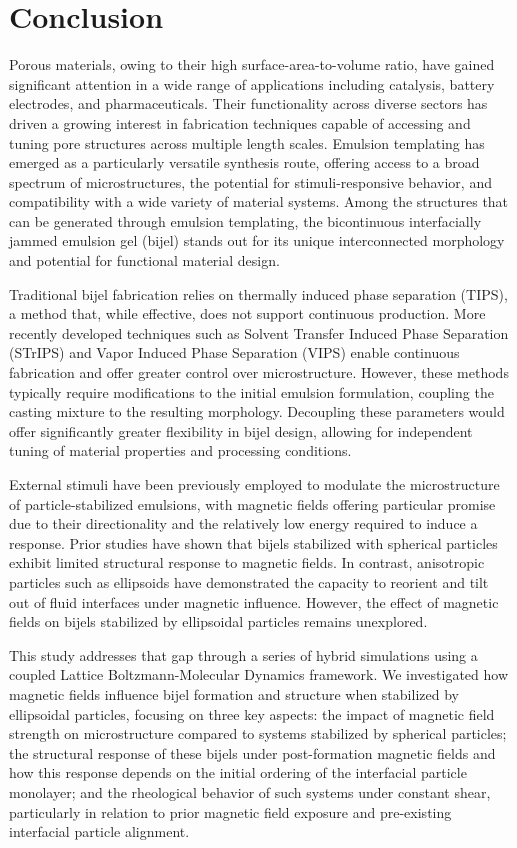 \section{Conclusion}

Porous materials, owing to their high surface-area-to-volume ratio, have gained significant attention in a wide range of 
applications including catalysis, battery electrodes, and pharmaceuticals. Their functionality across diverse sectors has 
driven a growing interest in fabrication techniques capable of accessing and tuning pore structures across multiple length 
scales. Emulsion templating has emerged as a particularly versatile synthesis route, offering access to a broad spectrum of 
microstructures, the potential for stimuli-responsive behavior, and compatibility with a wide variety of material systems. 
Among the structures that can be generated through emulsion templating, the bicontinuous interfacially jammed emulsion gel 
(bijel) stands out for its unique interconnected morphology and potential for functional material design.

Traditional bijel fabrication relies on thermally induced phase separation (TIPS), a method that, while effective, does not 
support continuous production. More recently developed techniques such as Solvent Transfer Induced Phase Separation (STrIPS) 
and Vapor Induced Phase Separation (VIPS) enable continuous fabrication and offer greater control over microstructure. However, 
these methods typically require modifications to the initial emulsion formulation, coupling the casting mixture to the resulting 
morphology. Decoupling these parameters would offer significantly greater flexibility in bijel design, allowing for independent 
tuning of material properties and processing conditions.

External stimuli have been previously employed to modulate the microstructure of particle-stabilized emulsions, with magnetic 
fields offering particular promise due to their directionality and the relatively low energy required to induce a response. Prior 
studies have shown that bijels stabilized with spherical particles exhibit limited structural response to magnetic fields. In 
contrast, anisotropic particles such as ellipsoids have demonstrated the capacity to reorient and tilt out of fluid interfaces 
under magnetic influence. However, the effect of magnetic fields on bijels stabilized by ellipsoidal particles remains unexplored.

This study addresses that gap through a series of hybrid simulations using a coupled Lattice Boltzmann-Molecular Dynamics framework. 
We investigated how magnetic fields influence bijel formation and structure when stabilized by ellipsoidal particles, focusing on 
three key aspects: the impact of magnetic field strength on microstructure compared to systems stabilized by spherical particles; 
the structural response of these bijels under post-formation magnetic fields and how this response depends on the initial ordering 
of the interfacial particle monolayer; and the rheological behavior of such systems under constant shear, particularly in relation 
to prior magnetic field exposure and pre-existing interfacial particle alignment.

